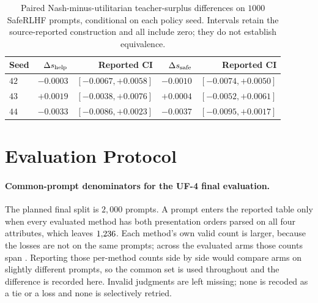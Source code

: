 \documentclass{article}
\theoremstyle{remark}
\theoremstyle{plain}
\begin{document}
\begin{table}[t]
\centering\small
\caption{Paired Nash-minus-utilitarian teacher-surplus differences on $1000$ SafeRLHF prompts, conditional on each policy seed. Intervals retain the source-reported construction and all include zero; they do not establish equivalence.}
\label{tab:aggregation-policy-pairs}
\begin{tabular}{lrrrr}
\toprule
Seed & $\Delta s_{\rm help}$ & Reported CI & $\Delta s_{\rm safe}$ & Reported CI\\
\midrule
$42$ & $-0.0003$ & $[-0.0067,+0.0058]$ & $-0.0010$ & $[-0.0074,+0.0050]$\\
$43$ & $+0.0019$ & $[-0.0038,+0.0076]$ & $+0.0004$ & $[-0.0052,+0.0061]$\\
$44$ & $-0.0033$ & $[-0.0086,+0.0023]$ & $-0.0037$ & $[-0.0095,+0.0017]$\\
\bottomrule
\end{tabular}
\end{table}

\section{Evaluation Protocol}
\label{app:evaluation}

\paragraph{Common-prompt denominators for the UF-4 final evaluation.}
The planned final split is $2{,}000$ prompts. A prompt enters the reported table only when every evaluated method has both presentation orders parsed on all four attributes, which leaves $1{,}236$. Each method's own valid count is larger, because the losses are not on the same prompts; across the evaluated arms those counts span \tabonevalidrange{}. Reporting those per-method counts side by side would compare arms on slightly different prompts, so the common set is used throughout and the difference is recorded here. Invalid judgments are left missing; none is recoded as a tie or a loss and none is selectively retried.
\end{document}
